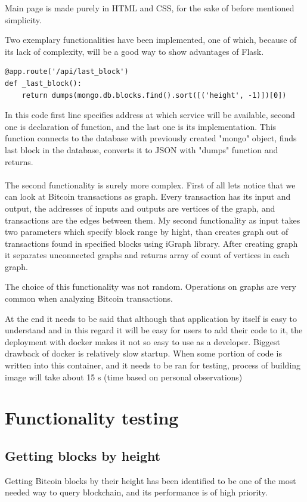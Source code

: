 \documentclass[12pt, en, eng, oneside]{mgr}
\begin{document}
Main page is made purely in HTML and CSS, for the sake of before mentioned simplicity.

Two exemplary functionalities have been implemented, one of which, because of its lack of complexity, will be a good way to show advantages of Flask.
\begin{verbatim}
@app.route('/api/last_block')
def _last_block():
    return dumps(mongo.db.blocks.find().sort([('height', -1)])[0])
\end{verbatim}
In this code first line specifies address at which service will be available, second one is declaration of function, and the last one is its implementation. This function connects to the database with previously created "mongo" object, finds last block in the database, converts it to JSON with "dumps" function and returns.
\\
\\
The second functionality is surely more complex. First of all lets notice that we can look at Bitcoin transactions as graph. Every transaction has its input and output, the addresses of inputs and outputs are vertices of the graph, and transactions are the edges between them. My second functionality as input takes two parameters which specify block range by hight, than creates graph out of transactions found in specified blocks using iGraph library. After creating graph it separates unconnected graphs and returns array of count of vertices in each graph.

The choice of this functionality was not random. Operations on graphs are very common when analyzing Bitcoin transactions.

At the end it needs to be said that although that application by itself is easy to understand and in this regard it will be easy for users to add their code to it, the deployment with docker makes it not so easy to use as a developer. Biggest drawback of docker is relatively slow startup. When some portion of code is written into this container, and it needs to be ran for testing, process of building image will take about 15 s (time based on personal observations) 

\chapter{Functionality testing}

\section{Getting blocks by height}
Getting Bitcoin blocks by their height has been identified to be one of the most needed way to query blockchain, and its performance is of high priority.
 
\end{document}
